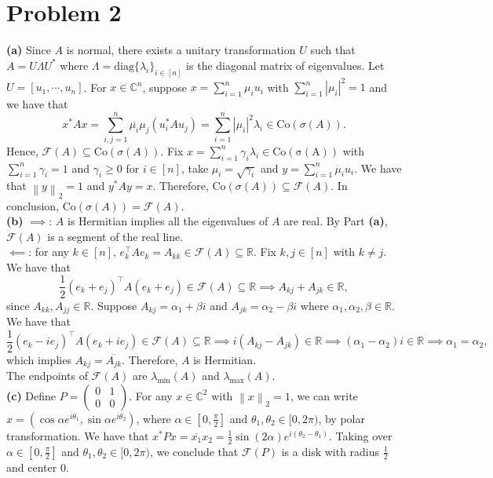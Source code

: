 \documentclass[11pt]{article}
\theoremstyle{plain}
\theoremstyle{definition}
\theoremstyle{remark}
\newcommand{\norm}[1]{\left\lVert #1 \right\rVert}
\newcommand{\diag}{\mathrm{diag}}
\newcommand{\R}{\mathbb{R}}
\newcommand{\C}{\mathbb{C}}
\newcommand{\abs}[1]{\left\vert#1\right\vert}
\def\+#1{\mathcal{#1}} %
\def\-#1{\mathrm{#1}} %
\begin{document}
\section*{Problem 2}
\textbf{(a)} Since $A$ is normal, there exists a unitary transformation $U$ such that $A = U \Lambda U^*$ where $\Lambda = \diag\{\lambda_i\}_{i\in[n]}$ is the diagonal matrix of eigenvalues.
Let $U = [u_1,\cdots,u_n]$.
For $x\in \C^n$, suppose $x = \sum_{i=1}^n \mu_iu_i$ with $\sum_{i=1}^n\abs{\mu_i}^2 = 1$ and we have that 
$$
    x^*Ax = \sum_{i,j=1}^n \overline{\mu_i}\mu_j (u_i^*Au_j) = \sum_{i=1}^n \abs{\mu_i}^2 \lambda_i \in \-{Co}(\sigma(A)).
$$
Hence, $\+F(A) \subseteq \-{Co}(\sigma(A))$.
Fix $x =  \sum_{i=1}^n \gamma_i\lambda_i \in \-{Co(\sigma(A))}$ with $\sum_{i=1}^n \gamma_i=1$ and $\gamma_i \geq 0$ for $i\in[n]$, take $\mu_i = \sqrt{\gamma_i}$ and $y = \sum_{i=1}^n \mu_i u_i$.
We have that $\norm{y}_2=1$ and $y^*Ay = x$.
Therefore, $\-{Co}(\sigma(A)) \subseteq \+F(A)$.
In conclusion, $\-{Co}(\sigma(A)) = \+F(A)$.
\\\textbf{(b)} $\boldsymbol{\implies}$: $A$ is Hermitian implies all the eigenvalues of $A$ are real.
By Part \textbf{(a)}, $\+F(A)$ is a segment of the real line.
\\$\boldsymbol{\impliedby}$: for any $k\in [n]$, $e_k^\top Ae_k = A_{kk}\in \+F(A)\subseteq \R$.
Fix $k,j\in[n]$ with $k\neq j$.
We have that
$$
    \frac 12(e_k+e_j)^\top A(e_k+e_j) \in \+F(A) \subseteq \R \implies A_{kj} + A_{jk}\in \R,
$$
since $A_{kk},A_{jj}\in \R$.
Suppose $A_{kj} = \alpha_1 + \beta i$ and $A_{jk} = \alpha_2 - \beta i$ where $\alpha_1,\alpha_2,\beta\in \R$.
We have that 
$$
    \frac 12(e_k-ie_j)^\top A(e_k+ie_j) \in \+F(A) \subseteq \R \implies i(A_{kj} - A_{jk})\in \R \implies (\alpha_1-\alpha_2)i\in\R \implies \alpha_1=\alpha_2,
$$
which implies $A_{kj} = \overline{A_{jk}}$.
Therefore, $A$ is Hermitian.
\\The endpoints of $\+F(A)$ are $\lambda_{\min}(A)$ and $\lambda_{\max}(A)$. 
\\\textbf{(c)}
Define $P = \begin{pmatrix}
    0 & 1 \\ 0 & 0
\end{pmatrix}$.
For any $x\in \C^2$ with $\norm{x}_2=1$, we can write $x = (\cos\alpha e^{i\theta_1},\sin\alpha e^{i\theta_2})$, where $\alpha \in [0,\frac \pi2]$ and $\theta_1,\theta_2\in [0,2\pi)$, by polar transformation.
We have that $x^*Px = \overline{x_1}x_2 = \frac{1}{2}\sin(2\alpha)e^{i(\theta_2-\theta_1)}$.
Taking over $\alpha \in [0,\frac \pi2]$ and $\theta_1,\theta_2\in [0,2\pi)$, we conclude that $\+F(P)$ is a disk with radius $\frac 12$ and center $0$.
\end{document}
